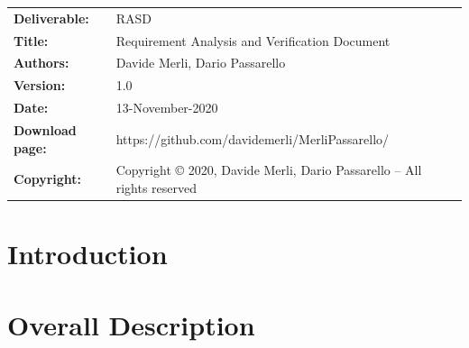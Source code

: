 \begin{table}[h!]
  \begin{tabu} to \textwidth { X[0.3,r,p] X[0.7,l,p] }
    \hline

    \textbf{Deliverable:}   & RASD                                                                   \\
    \textbf{Title:}         & Requirement Analysis and Verification Document                         \\
    \textbf{Authors:}       & Davide Merli, Dario Passarello                                         \\
    \textbf{Version:}       & 1.0                                                                    \\
    \textbf{Date:}          & 13-November-2020                                                       \\
    \textbf{Download page:} & https://github.com/davidemerli/MerliPassarello/                        \\
    \textbf{Copyright:}     & Copyright © 2020, Davide Merli, Dario Passarello – All rights reserved \\
    \hline
  \end{tabu}
\end{table}




\setcounter{page}{2}


\newpage
{}
\tableofcontents
\newpage
{}
\listoffigures
{}
\listoftables

\clearpage
{{\section{Introduction}}}
\label{sect:introduction}


\clearpage
{{\section{Overall Description}}}
\label{sect:overview}


